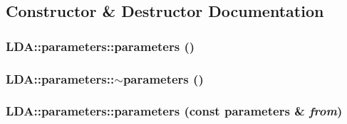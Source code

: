 \subsection{Constructor \& Destructor Documentation}
\hypertarget{class_l_d_a_1_1parameters_ac79ed72ff12174ebfd8c0f197de1731d}{
\subsubsection[{parameters}]{\setlength{\rightskip}{0pt plus 5cm}LDA::parameters::parameters ()}}
\label{class_l_d_a_1_1parameters_ac79ed72ff12174ebfd8c0f197de1731d}
\hypertarget{class_l_d_a_1_1parameters_a5e50e4547d209782fbfc305ceb5d011a}{
\subsubsection[{$\sim$parameters}]{\setlength{\rightskip}{0pt plus 5cm}LDA::parameters::$\sim$parameters ()}}
\label{class_l_d_a_1_1parameters_a5e50e4547d209782fbfc305ceb5d011a}
\hypertarget{class_l_d_a_1_1parameters_af3e3c7327cd115e60670239997931a42}{
\subsubsection[{parameters}]{\setlength{\rightskip}{0pt plus 5cm}LDA::parameters::parameters (const {\bf parameters} \& {\em from})}}
\label{class_l_d_a_1_1parameters_af3e3c7327cd115e60670239997931a42}


